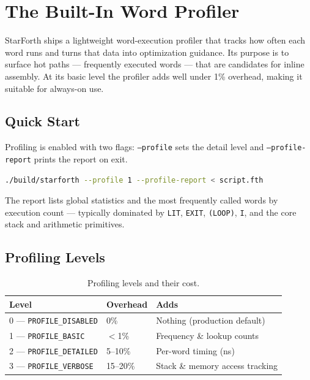 
\section{The Built-In Word Profiler}

StarForth ships a lightweight word-execution profiler that tracks how often
each word runs and turns that data into optimization guidance. Its purpose is
to surface hot paths --- frequently executed words --- that are candidates for
inline assembly. At its basic level the profiler adds well under 1\% overhead,
making it suitable for always-on use.

\subsection{Quick Start}

Profiling is enabled with two flags: \texttt{--profile} sets the detail level
and \texttt{--profile-report} prints the report on exit.

\begin{lstlisting}[language=bash]
./build/starforth --profile 1 --profile-report < script.fth
\end{lstlisting}

The report lists global statistics and the most frequently called words by
execution count --- typically dominated by \texttt{LIT}, \texttt{EXIT},
\texttt{(LOOP)}, \texttt{I}, and the core stack and arithmetic primitives.

\subsection{Profiling Levels}

\begin{table}[h]
\centering
\begin{tabular}{lll}
\toprule
Level & Overhead & Adds \\
\midrule
0 --- \texttt{PROFILE\_DISABLED} & 0\% & Nothing (production default) \\
1 --- \texttt{PROFILE\_BASIC} & $<$1\% & Frequency \& lookup counts \\
2 --- \texttt{PROFILE\_DETAILED} & 5--10\% & Per-word timing (ns) \\
3 --- \texttt{PROFILE\_VERBOSE} & 15--20\% & Stack \& memory access tracking \\
\bottomrule
\end{tabular}
\caption{Profiling levels and their cost.}
\end{table}

